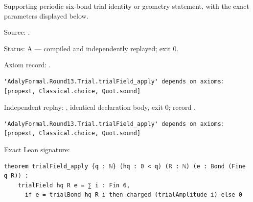 \begin{theorem}[bp-357]
\label{bp-357}
\leanok
Supporting periodic six-bond trial identity or geometry statement, with the exact parameters displayed below.

\par Source: \texttt{}.
\par Status: A — compiled and independently replayed; exit 0.
\par Axiom record: \texttt{}.
\begin{verbatim}
'AdalyFormal.Round13.Trial.trialField_apply' depends on axioms: [propext, Classical.choice, Quot.sound]
\end{verbatim}
\par Independent replay: \texttt{}, identical declaration body, exit 0; record \texttt{}.
\begin{verbatim}
'AdalyFormal.Round13.Trial.trialField_apply' depends on axioms: [propext, Classical.choice, Quot.sound]
\end{verbatim}
\par Exact Lean signature:
\begin{verbatim}
theorem trialField_apply {q : ℕ} (hq : 0 < q) (R : ℕ) (e : Bond (Fine q R)) :
    trialField hq R e = ∑ i : Fin 6,
      if e = trialBond hq R i then charged (trialAmplitude i) else 0
\end{verbatim}
\end{theorem}

